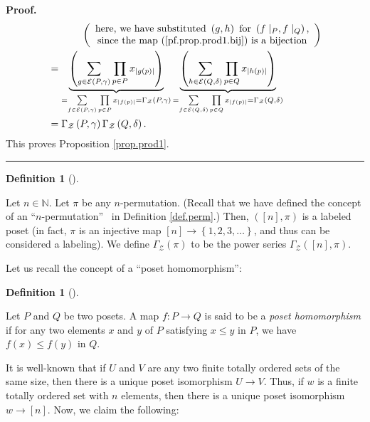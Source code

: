 \documentclass[numbers=enddot,12pt,final,onecolumn,notitlepage]{scrartcl}%
\theoremstyle{definition}
\newtheorem{defi}[theo]{Definition}
\newenvironment{definition}[1][]
{\begin{defi}[#1]\begin{leftbar}}
{\end{leftbar}\end{defi}}
\newenvironment{proof}[1][Proof]{\noindent\textbf{#1.} }{\ \rule{0.5em}{0.5em}}
\let\sumnonlimits\sum
\let\prodnonlimits\prod
\renewcommand{\sum}{\sumnonlimits\limits}
\renewcommand{\prod}{\prodnonlimits\limits}
\begin{document}
\begin{proof}
\begin{align*}
&  \ \ \ \ \ \ \ \ \ \ \left(
\begin{array}
[c]{c}%
\text{here, we have substituted }\left(  g,h\right)  \text{ for }\left(
f\mid_{P},f\mid_{Q}\right)  \text{,}\\
\text{since the map (\ref{pf.prop.prod1.bij}) is a bijection}%
\end{array}
\right) \\
&  =\underbrace{\left(  \sum_{g\in\mathcal{E}\left(  P,\gamma\right)  }%
\prod_{p\in P}x_{\left\vert g\left(  p\right)  \right\vert }\right)
}_{= \sum_{f\in\mathcal{E}\left(  P,\gamma\right)  }%
\prod_{p\in P}x_{\left\vert f\left(  p\right)  \right\vert }
= \Gamma_{\mathcal{Z}}\left(  P,\gamma\right)  }\underbrace{\left(
\sum_{h\in\mathcal{E}\left(  Q,\delta\right)  }\prod_{p\in Q}x_{\left\vert
h\left(  p\right)  \right\vert }\right)  }_{
= \sum_{f\in\mathcal{E}\left(  Q,\delta\right)  }\prod_{p\in Q}x_{\left\vert
f\left(  p\right)  \right\vert }
= \Gamma_{\mathcal{Z}}\left( Q,\delta\right)  }\\
&  =\Gamma_{\mathcal{Z}}\left(  P,\gamma\right)  \Gamma_{\mathcal{Z}}\left(
Q,\delta\right)  .
\end{align*}
This proves Proposition \ref{prop.prod1}.
\end{proof}

\begin{definition}
Let $n\in\mathbb{N}$. Let $\pi$ be any $n$-permutation. (Recall that we have
defined the concept of an \textquotedblleft$n$-permutation\textquotedblright%
\ in Definition \ref{def.perm}.) Then, $\left(  \left[  n\right]  ,\pi\right)
$ is a labeled poset (in fact, $\pi$ is an injective map $\left[  n\right]
\rightarrow\left\{  1,2,3,\ldots\right\}  $, and thus can be considered a
labeling). We define $\Gamma_{\mathcal{Z}}\left(  \pi\right)  $ to be the
power series $\Gamma_{\mathcal{Z}}\left(  \left[  n\right]  ,\pi\right)  $.
\end{definition}

Let us recall the concept of a ``poset homomorphism'':

\begin{definition}
Let $P$ and $Q$ be two posets.
A map $f : P \to Q$ is said to be a \textit{poset homomorphism} if
for any two elements $x$ and $y$ of $P$ satisfying $x \leq y$ in $P$,
we have $f\left(x\right) \leq f\left(y\right)$ in $Q$.
\end{definition}

It is well-known that if $U$ and $V$ are any two finite totally ordered sets
of the same size, then there is a unique poset isomorphism $U \to V$.
Thus, if $w$ is a finite totally ordered set with $n$ elements, then there
is a unique poset isomorphism $w \to \left[ n \right]$.
Now, we claim the following:
\end{document}
